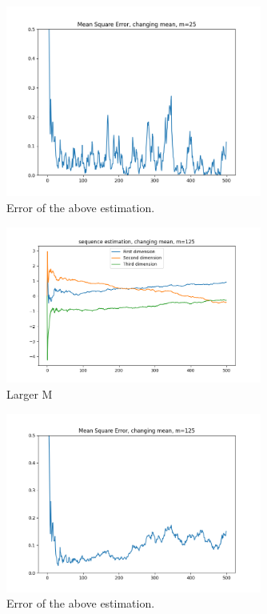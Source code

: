 \documentclass{article}
\begin{document}
\begin{figure}[h]
    \centering
    \includegraphics[width=0.75\textwidth]{03_sequential_estimation/indep_2_m25.png}
    \caption{Error of the above estimation.}
\end{figure}
\begin{figure}[h]
    \centering
    \includegraphics[width=0.75\textwidth]{03_sequential_estimation/indep_1_m125.png}
    \caption{Larger M}
\end{figure}
\begin{figure}[h]
    \centering
    \includegraphics[width=0.75\textwidth]{03_sequential_estimation/indep_2_m125.png}
    \caption{Error of the above estimation.}
\end{figure}
\end{document}
